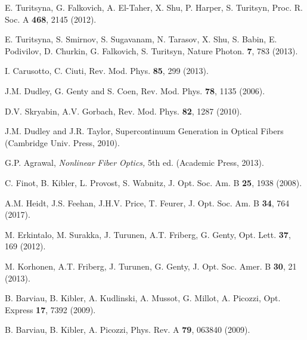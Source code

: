 \documentclass[pra,twocolumn,showpacs,preprintnumbers,amsmath,amssymb]{revtex4}
\begin{document}
\begin{thebibliography}{99}
E. Turitsyna, G. Falkovich, A. El-Taher, X. Shu, P. Harper, S. Turitsyn, 
Proc. R. Soc. A {\bf 468}, 2145 (2012).

E. Turitsyna, S. Smirnov, S. Sugavanam, N. Tarasov, X. Shu, S. Babin, E. Podivilov, D. Churkin, G. Falkovich, S. Turitsyn, 
Nature Photon. {\bf 7}, 783 (2013).

I. Carusotto, C. Ciuti, 
Rev. Mod. Phys. {\bf 85}, 299 (2013).

J.M. Dudley, G. Genty and S. Coen, 
Rev. Mod. Phys. {\bf 78}, 1135 (2006).

D.V. Skryabin, A.V. Gorbach, 
Rev. Mod. Phys. {\bf 82}, 1287 (2010).

J.M. Dudley and J.R. Taylor, 
Supercontinuum Generation in Optical Fibers (Cambridge Univ. Press, 2010).

G.P. Agrawal, {\it Nonlinear Fiber Optics,} 5th ed. (Academic Press,
2013).

C. Finot, B. Kibler, L. Provost, S. Wabnitz,
J. Opt. Soc. Am. B {\bf 25}, 1938 (2008).

A.M. Heidt, J.S. Feehan, J.H.V. Price, T. Feurer,
J. Opt. Soc. Am. B {\bf 34}, 764 (2017).

M. Erkintalo, M. Surakka, J. Turunen, A.T. Friberg, G. Genty, 
Opt. Lett. {\bf 37}, 169 (2012).


M. Korhonen, A.T. Friberg, J. Turunen, G. Genty, 
J. Opt. Soc. Amer. B {\bf 30}, 21 (2013).

B. Barviau, B. Kibler, A. Kudlinski, A. Mussot, G. Millot, A. Picozzi,
Opt. Express {\bf 17}, 7392 (2009).

B. Barviau, B. Kibler, A. Picozzi,
Phys. Rev. A \textbf{79}, 063840 (2009).


\end{thebibliography}
\end{document}
